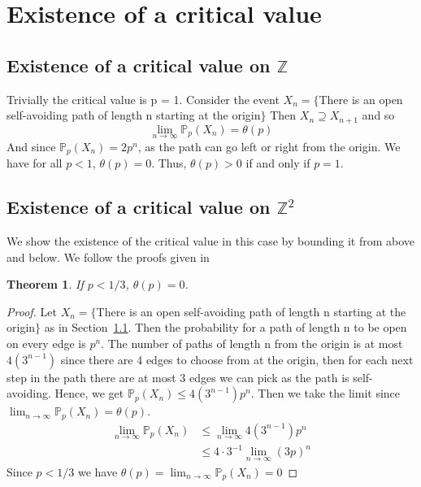 \documentclass[a4paper,11pt]{article}
\newtheorem{theorem}{Theorem}[section]
\theoremstyle{definition}
\newcommand{\ints}{\mathbb{Z}}
\newcommand{\prob}{\mathbb{P}_p}
\begin{document}
\section{Existence of a critical value}
\subsection {Existence of a critical value on \texorpdfstring{$\ints$}{ Z}}\label{critvalforZ}
Trivially the critical value is p = 1. Consider the event $X_n = \{$There is an open self-avoiding path of length n starting at the origin$\}$ 
Then $X_n \supseteq X_{n+1}$ and so 
$$\lim_{n\rightarrow \infty} \prob (X_n) = \theta(p)$$
And since $\prob (X_n) = 2p^n$, as the path can go left or right from the origin. We have for all $p <1$, $\theta(p) = 0$. Thus, $\theta(p) > 0$ if and only if $p = 1$. 


\subsection {Existence of a critical value on \texorpdfstring{$\ints^2$}{ Z2}} \label{critvalZ2}
We show the existence of the critical value in this case by bounding it from above and below. We follow the proofs given in \cite{steif2011mini}
\begin{theorem}
	If $p < 1/3$, $\theta(p) = 0$.
\end{theorem}
\begin{proof}
	Let $X_n = \{$There is an open self-avoiding path of length n starting at the origin$\}$ as in Section~\ref{critvalforZ}.
	Then the probability for a path of length n to be open on every edge is $p^n$. The number of paths of length n from the origin is at most $4(3^{n-1})$ since there are 4 edges to choose from at the origin, then for each next step in the path there are at most 3 edges we can pick as the path is self-avoiding.
	Hence, we get $\prob(X_n) \leq  4(3^{n-1})p^n  $. Then we take the limit since
	$\lim_{n\rightarrow \infty}\prob(X_n) = \theta(p)$.
	\begin{align*}
		\lim_{n\rightarrow \infty}\prob(X_n) &\leq  \lim_{n\rightarrow \infty}4(3^{n-1})p^n\\
		 &\leq 4\cdot  3^{-1} \lim_{n\rightarrow \infty}(3p)^{n}
	 \end{align*}
	 Since $p < 1/3$ we have $\theta(p)=\lim_{n\rightarrow \infty}\prob(X_n) = 0$
\end{proof}
\end{document}
